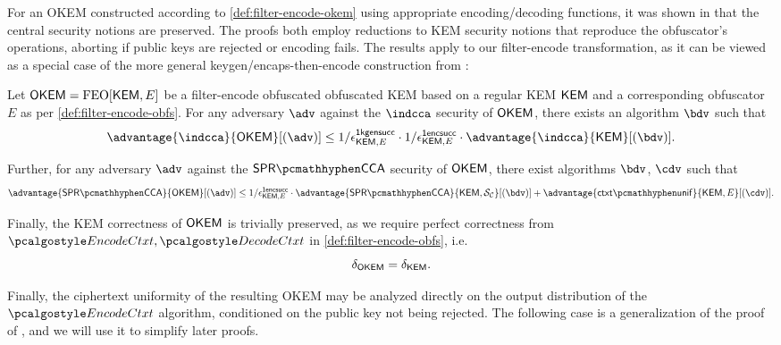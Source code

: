 For an OKEM constructed according to \cref{def:filter-encode-okem} using appropriate encoding/decoding functions, it was shown in \cite[Theorems 2.12 and 2.13]{CCS:GunSteVei24} that the central security notions are preserved. The proofs both employ reductions to KEM security notions that reproduce the obfuscator's operations, aborting if public keys are rejected or encoding fails.
The results apply to our filter-encode transformation, as it can be viewed as a special case of the more general keygen/encaps-then-encode construction from \cite{CCS:GunSteVei24}:

\begin{theorem}
\label{thm:filter-encode-security}
    Let $\mathsf{OKEM} = \textsf{\textnormal{FEO}}[\mathsf{KEM}, E]$ be a filter-encode obfuscated obfuscated KEM based on a regular KEM $\mathsf{KEM}$ and a corresponding obfuscator $E$ as per \cref{def:filter-encode-obfs}.
    For any adversary $\adv$ against the $\indcca$ security of $\mathsf{OKEM}$, there exists an algorithm $\bdv$ such that
    \[
        \advantage{\indcca}{\OKEM}[(\adv)]
        \leq
        1/\epsilon^\firstkeygensuccess_{\KEM,E}
        \cdot 1/\epsilon^\firstencapssuccess_{\KEM,E}
        \cdot \advantage{\indcca}{\KEM}[(\bdv)].
    \]

    Further, for any adversary $\adv$ against the $\sprcca$ security of $\mathsf{OKEM}$, there exist algorithms $\bdv$, $\cdv$ such that
    \[
        \advantage{\sprcca}{\OKEM}[(\adv)]
        \leq 
        1/\epsilon^\firstencapssuccess_{\KEM,E}
        \cdot \advantage{\sprcca}{\KEM,\simulunif}[(\bdv)]
        + \advantage{\ctxtunif}{\KEM,E}[(\cdv)].
    \]

    Finally, the KEM correctness of $\mathsf{OKEM}$ is trivially preserved, as we require perfect correctness from $\encodectxt,\decodectxt$ in \cref{def:filter-encode-obfs}, i.e.
    \[
        \delta_{\mathsf{OKEM}} = \delta_{\mathsf{KEM}}.
    \]
\end{theorem}

Finally, the ciphertext uniformity of the resulting OKEM may be analyzed directly on the output distribution of the $\encodectxt$ algorithm, conditioned on the public key not being rejected. The following case is a generalization of the proof of \cite[Lemma~2.15]{CCS:GunSteVei24}, and we will use it to simplify later proofs.

